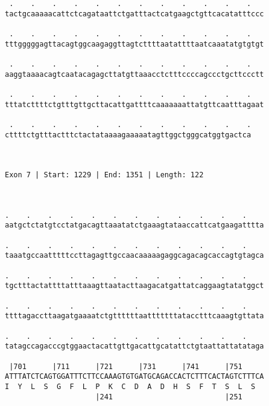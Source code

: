\documentclass{article}
\begin{document}
\begin{Verbatim}
 .    .    .    .    .    .    .    .    .    .    .    .   
tactgcaaaaacattctcagataattctgatttactcatgaagctgttcacatatttccc
                                                            
 .    .    .    .    .    .    .    .    .    .    .    .   
tttgggggagttacagtggcaagaggttagtcttttaatattttaatcaaatatgtgtgt
                                                            
 .    .    .    .    .    .    .    .    .    .    .    .   
aaggtaaaacagtcaatacagagcttatgttaaacctctttccccagccctgcttccctt
                                                            
 .    .    .    .    .    .    .    .    .    .    .    .   
tttatcttttctgtttgttgcttacattgattttcaaaaaaattatgttcaatttagaat
                                                            
 .    .    .    .    .    .    .    .    .    .    .    .
cttttctgtttactttctactataaaagaaaaatagttggctgggcatggtgactca
                                                         
                                                         
 
Exon 7 | Start: 1229 | End: 1351 | Length: 122



.    .    .    .    .    .    .    .    .    .    .    .    
aatgctctatgtcctatgacagttaaatatctgaaagtataaccattcatgaagatttta
                                                            
.    .    .    .    .    .    .    .    .    .    .    .    
taaatgccaatttttccttagagttgccaacaaaaagaggcagacagcaccagtgtagca
                                                            
.    .    .    .    .    .    .    .    .    .    .    .    
tgctttactattttatttaaagttaatacttaagacatgattatcaggaagtatatggct
                                                            
.    .    .    .    .    .    .    .    .    .    .    .    
ttttagaccttaagatgaaaatctgttttttaatttttttatacctttcaaagtgttata
                                                            
.    .    .    .    .    .    .    .    .    .    .    .    
tatagccagacccgtggaactacattgttgacattgcatattctgtaattattatataga
                                                            
 |701      |711      |721      |731      |741      |751     
ATTTATCTCAGTGGATTTCTTCCAAAGTGTGATGCAGACCACTCTTTCACTAGTCTTTCA
I  Y  L  S  G  F  L  P  K  C  D  A  D  H  S  F  T  S  L  S  
                     |241                          |251     
  

\end{Verbatim}
\end{document}
